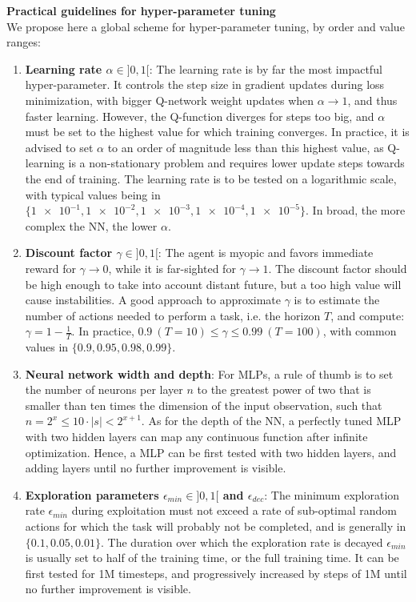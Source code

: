 \textbf{Practical guidelines for hyper-parameter tuning} \\
We propose here a global scheme for hyper-parameter tuning, by order and value ranges:
\begin{enumerate}
    \setlength\itemsep{-0.5em}
    \item \textbf{Learning rate $\alpha \in ]0, 1[$}: The learning rate is by far the most impactful hyper-parameter. It controls the step size in gradient updates during loss minimization, with bigger Q-network weight updates when $\alpha \rightarrow 1$, and thus faster learning. However, the Q-function diverges for steps too big, and $\alpha$ must be set to the highest value for which training converges. In practice, it is advised to set $\alpha$ to an order of magnitude less than this highest value, as Q-learning is a non-stationary problem and requires lower update steps towards the end of training. The learning rate is to be tested on a logarithmic scale, with typical values being in $\{\num{1e-1},\num{1e-2},\num{1e-3},\num{1e-4},\num{1e-5}\}$. In broad, the more complex the NN, the lower $\alpha$.
    \item \textbf{Discount factor $\gamma \in ]0, 1[$}: The agent is myopic and favors immediate reward for $\gamma \rightarrow 0$, while it is far-sighted for $\gamma \rightarrow 1$. The discount factor should be high enough to take into account distant future, but a too high value will cause instabilities. A good approach to approximate $\gamma$ is to estimate the number of actions needed to perform a task, i.e. the horizon $T$, and compute: $\gamma = 1 - \frac{1}{T}$. In practice, $0.9 \ (T = 10) \leq \gamma \leq 0.99 \ (T = 100)$, with common values in $\{0.9, 0.95, 0.98, 0.99\}$.
    \item \textbf{Neural network width and depth}: For MLPs, a rule of thumb is to set the number of neurons per layer $n$ to the greatest power of two that is smaller than ten times the dimension of the input observation, such that $n = 2^x \leq 10 \cdot |s| < 2^{x+1}$. As for the depth of the NN, a perfectly tuned MLP with two hidden layers can map any continuous function after infinite optimization. Hence, a MLP can be first tested with two hidden layers, and adding layers until no further improvement is visible.
    \item \textbf{Exploration parameters $\epsilon_{min} \in ]0, 1[$ and $\epsilon_{dec}$}: The minimum exploration rate $\epsilon_{min}$ during exploitation must not exceed a rate of sub-optimal random actions for which the task will probably not be completed, and is generally in $\{0.1, 0.05, 0.01\}$. The duration over which the exploration rate is decayed $\epsilon_{min}$ is usually set to half of the training time, or the full training time. It can be first tested for 1M timesteps, and progressively increased by steps of 1M until no further improvement is visible.

\end{enumerate}

